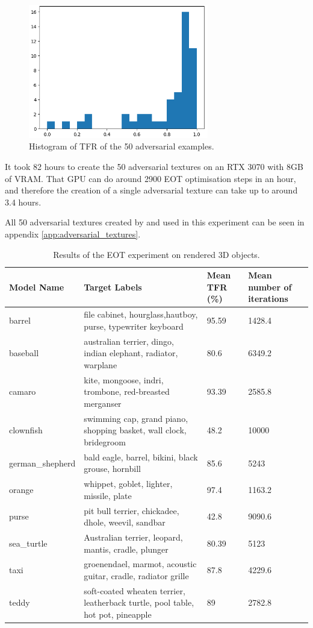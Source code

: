\begin{figure}[ht]
    \centering
    \includegraphics[width=0.7\textwidth]{graphics/eot_histogram.PNG}
    \caption{Histogram of TFR of the 50 adversarial examples.}
    \label{fig:eot_histogram}
\end{figure}

It took 82 hours to create the 50 adversarial textures on an RTX 3070 with 8GB of VRAM. That GPU can do around 2900 EOT optimisation steps in an hour, and therefore the creation of a single adversarial texture can take up to around 3.4 hours.

All 50 adversarial textures created by and used in this experiment can be seen in appendix \ref{app:adversarial_textures}.

\begin{table}
\caption{Results of the EOT experiment on rendered 3D objects.}
\label{table:eot_results}
\begin{tabular}{|p{2.6cm} | p{6.5cm} | p{2cm}| p{2cm}|} 
 \hline
 Model Name & Target Labels & Mean TFR (\%) & Mean number of iterations \\
 \hline
 barrel & file cabinet, hourglass,hautboy, purse, typewriter keyboard & 95.59 & 1428.4 \\ 
 \hline
 baseball & australian terrier, dingo, indian elephant, radiator, warplane & 80.6 & 6349.2 \\
 \hline
 camaro & kite, mongoose, indri, trombone, red-breasted merganser & 93.39 & 2585.8 \\
 \hline
 clownfish & swimming cap, grand piano, shopping basket, wall clock, bridegroom & 48.2 & 10000 \\
 \hline
 german\_shepherd & bald eagle, barrel, bikini, black grouse, hornbill & 85.6 & 5243 \\
 \hline
 orange & whippet, goblet, lighter, missile, plate & 97.4 & 1163.2 \\
 \hline
 purse & pit bull terrier, chickadee, dhole, weevil, sandbar & 42.8 & 9090.6 \\
 \hline
 sea\_turtle & Australian terrier, leopard, mantis, cradle, plunger & 80.39 & 5123 \\
 \hline
 taxi & groenendael, marmot, acoustic guitar, cradle, radiator grille & 87.8 & 4229.6 \\
 \hline
 teddy & soft-coated wheaten terrier, leatherback turtle, pool table, hot pot, pineapple & 89 & 2782.8 \\
 \hline
\end{tabular}
\end{table}


